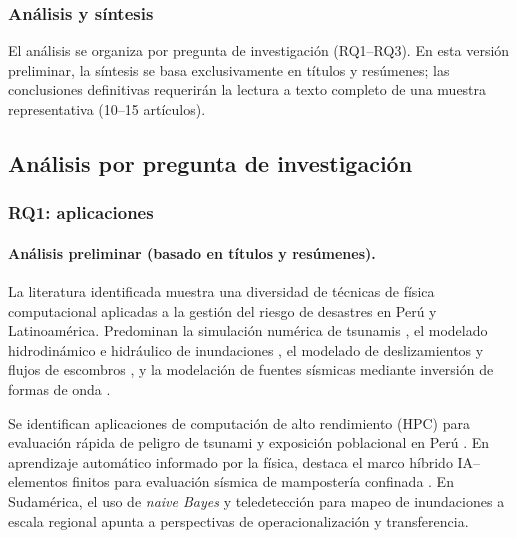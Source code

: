 \documentclass[12pt,a4paper]{article}
\begin{document}
\subsubsection{Análisis y síntesis}
El análisis se organiza por pregunta de investigación (RQ1--RQ3). En esta versión preliminar, la síntesis se basa exclusivamente en títulos y resúmenes; las conclusiones definitivas requerirán la lectura a texto completo de una muestra representativa (10--15 artículos).

\subsection{Análisis por pregunta de investigación}
\subsubsection{RQ1: aplicaciones}
\label{sec:rq1}
\paragraph*{Análisis preliminar (basado en títulos y resúmenes).}
La literatura identificada muestra una diversidad de técnicas de física computacional aplicadas a la gestión del riesgo de desastres en Perú y Latinoamérica. Predominan la simulación numérica de tsunamis \parencite{jimnez2023numerical, androsov2024nonlinear, davila2025probabilistic, garcia2025parallel}, el modelado hidrodinámico e hidráulico de inundaciones \parencite{fagundes2021sediment, fleischmann2021regional, escobarsilva2023assessing, saavedra2026impact}, el modelado de deslizamientos y flujos de escombros \parencite{marin2021assessing, ochoacornejo2025rock, meyrat2024simulating, flores2026numerical}, y la modelación de fuentes sísmicas mediante inversión de formas de onda \parencite{moreno2025tsunami, jimenez2024numerical, jimenez2025numerical, jimnez2023seismic, jiang2023estimation}. 

Se identifican aplicaciones de computación de alto rendimiento (HPC) para evaluación rápida de peligro de tsunami y exposición poblacional en Perú \parencite{garcia2025parallel}. En aprendizaje automático informado por la física, destaca el marco híbrido IA--elementos finitos para evaluación sísmica de mampostería confinada \parencite{yupanqui2025hybrid}. En Sudamérica, el uso de \textit{naive Bayes} y teledetección para mapeo de inundaciones a escala regional \parencite{kuchinski2025regional} apunta a perspectivas de operacionalización y transferencia. 
\end{document}
